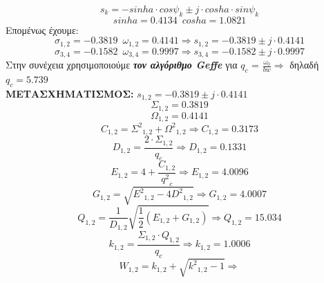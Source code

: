 \documentclass{article}
\begin{document}
{\begin{equation*}
s_k = -sinha \cdot cosψ_k \pm j \cdot cosha \cdot sinψ_k
\end{equation*}
\begin{equation*}
sinha = 0.4134 \enspace cosha = 1.0821
\end{equation*}
Επομένως έχουμε:
\begin{equation*}
σ_{1,2} = -0.3819 \enspace ω_{1,2} = 0.4141 \Rightarrow \boxed{s_{1,2} = -0.3819 \pm j\cdot0.4141} 
\end{equation*}
\begin{equation*}
σ_{3,4} = -0.1582 \enspace ω_{3,4} = 0.9997 \Rightarrow \boxed{s_{3,4} = -0.1582 \pm j\cdot0.9997} 
\end{equation*}
\newpage
Στην συνέχεια χρησιμοποιούμε \textbf{\textit{τον αλγόριθμο Geffe}} για $q_c$ = $\frac{{ω_0}}{bw} \Rightarrow$ δηλαδή $q_c = 5.739$ \\ 
\textbf{ΜΕΤΑΣΧΗΜΑΤΙΣΜΟΣ: } $s_{1,2} = -0.3819 \pm j\cdot 0.4141$\\
\begin{equation*}
{Σ}_{1,2} =0.3819
\end{equation*}
\begin{equation*}
{Ω}_{1,2} = 0.4141
\end{equation*}
\begin{equation*}
{C}_{1,2} = {Σ^2}_{1,2} + {Ω^2}_{1,2} \Rightarrow \boxed{{C}_{1,2} = 0.3173}
\end{equation*}
\begin{equation*}
{D}_{1,2} = \frac{2 \cdot {Σ}_{1,2}}{q_c} \Rightarrow \boxed{{D}_{1,2} = 0.1331}
\end{equation*}
\begin{equation*}
{E}_{1,2} = 4 +\frac{{C}_{1,2}}{{q^2}_c} \Rightarrow \boxed{{E}_{1,2} = 4.0096}
\end{equation*}
\begin{equation*}
{G}_{1,2} = \sqrt{{E^2}_{1,2} - 4{D^2}_{1,2}} \Rightarrow \boxed{{G}_{1,2} = 4.0007}
\end{equation*}
\begin{equation*}
{Q}_{1,2} = \frac{1}{{D}_{1,2}} \sqrt{\frac{1}{2}({E}_{1,2}+{G}_{1,2})} \Rightarrow \boxed{{Q}_{1,2} = 15.034}
\end{equation*}
\begin{equation*}
k_{1,2} = \frac{Σ_{1,2} \cdot Q_{1,2}}{q_c} \Rightarrow \boxed{k_{1,2} = 1.0006}
\end{equation*}
\begin{equation*}
W_{1,2} = k_{1,2} + \sqrt{{k^2}_{1,2}-1} \Rightarrow 

\end{equation*}}
\end{document}

